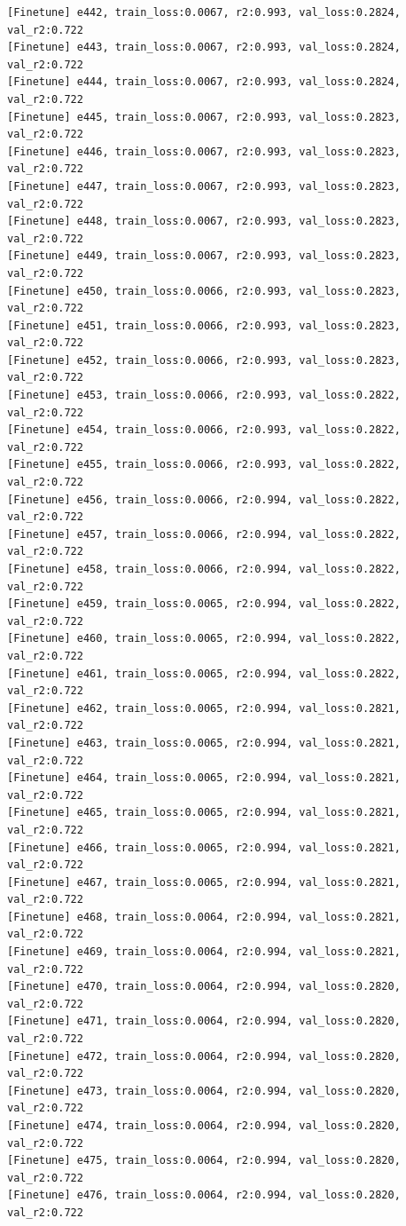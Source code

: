 \documentclass[a4paper, 12pt]{article}
\begin{document}
\begin{lstlisting}
[Finetune] e442, train_loss:0.0067, r2:0.993, val_loss:0.2824, val_r2:0.722
[Finetune] e443, train_loss:0.0067, r2:0.993, val_loss:0.2824, val_r2:0.722
[Finetune] e444, train_loss:0.0067, r2:0.993, val_loss:0.2824, val_r2:0.722
[Finetune] e445, train_loss:0.0067, r2:0.993, val_loss:0.2823, val_r2:0.722
[Finetune] e446, train_loss:0.0067, r2:0.993, val_loss:0.2823, val_r2:0.722
[Finetune] e447, train_loss:0.0067, r2:0.993, val_loss:0.2823, val_r2:0.722
[Finetune] e448, train_loss:0.0067, r2:0.993, val_loss:0.2823, val_r2:0.722
[Finetune] e449, train_loss:0.0067, r2:0.993, val_loss:0.2823, val_r2:0.722
[Finetune] e450, train_loss:0.0066, r2:0.993, val_loss:0.2823, val_r2:0.722
[Finetune] e451, train_loss:0.0066, r2:0.993, val_loss:0.2823, val_r2:0.722
[Finetune] e452, train_loss:0.0066, r2:0.993, val_loss:0.2823, val_r2:0.722
[Finetune] e453, train_loss:0.0066, r2:0.993, val_loss:0.2822, val_r2:0.722
[Finetune] e454, train_loss:0.0066, r2:0.993, val_loss:0.2822, val_r2:0.722
[Finetune] e455, train_loss:0.0066, r2:0.993, val_loss:0.2822, val_r2:0.722
[Finetune] e456, train_loss:0.0066, r2:0.994, val_loss:0.2822, val_r2:0.722
[Finetune] e457, train_loss:0.0066, r2:0.994, val_loss:0.2822, val_r2:0.722
[Finetune] e458, train_loss:0.0066, r2:0.994, val_loss:0.2822, val_r2:0.722
[Finetune] e459, train_loss:0.0065, r2:0.994, val_loss:0.2822, val_r2:0.722
[Finetune] e460, train_loss:0.0065, r2:0.994, val_loss:0.2822, val_r2:0.722
[Finetune] e461, train_loss:0.0065, r2:0.994, val_loss:0.2822, val_r2:0.722
[Finetune] e462, train_loss:0.0065, r2:0.994, val_loss:0.2821, val_r2:0.722
[Finetune] e463, train_loss:0.0065, r2:0.994, val_loss:0.2821, val_r2:0.722
[Finetune] e464, train_loss:0.0065, r2:0.994, val_loss:0.2821, val_r2:0.722
[Finetune] e465, train_loss:0.0065, r2:0.994, val_loss:0.2821, val_r2:0.722
[Finetune] e466, train_loss:0.0065, r2:0.994, val_loss:0.2821, val_r2:0.722
[Finetune] e467, train_loss:0.0065, r2:0.994, val_loss:0.2821, val_r2:0.722
[Finetune] e468, train_loss:0.0064, r2:0.994, val_loss:0.2821, val_r2:0.722
[Finetune] e469, train_loss:0.0064, r2:0.994, val_loss:0.2821, val_r2:0.722
[Finetune] e470, train_loss:0.0064, r2:0.994, val_loss:0.2820, val_r2:0.722
[Finetune] e471, train_loss:0.0064, r2:0.994, val_loss:0.2820, val_r2:0.722
[Finetune] e472, train_loss:0.0064, r2:0.994, val_loss:0.2820, val_r2:0.722
[Finetune] e473, train_loss:0.0064, r2:0.994, val_loss:0.2820, val_r2:0.722
[Finetune] e474, train_loss:0.0064, r2:0.994, val_loss:0.2820, val_r2:0.722
[Finetune] e475, train_loss:0.0064, r2:0.994, val_loss:0.2820, val_r2:0.722
[Finetune] e476, train_loss:0.0064, r2:0.994, val_loss:0.2820, val_r2:0.722

\end{lstlisting}
\end{document}

